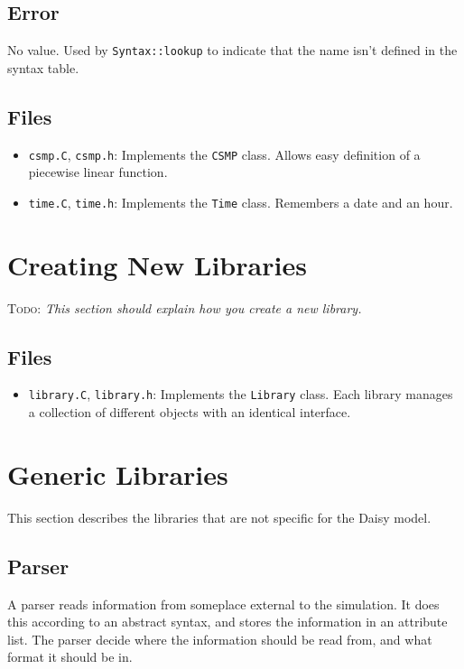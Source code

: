 \documentclass{article}
\newcommand{\code}[1]{\texttt{#1}}
\newcommand{\file}[1]{\texttt{#1}}
\newcommand{\todo}[1]{\textsc{Todo}: \textit{#1}}
\begin{document}
\subsection{Error}

No value.  Used by \code{Syntax::lookup} to indicate that the name
isn't defined in the syntax table.

\subsection{Files}

\begin{itemize}
\item \file{csmp.C}, \file{csmp.h}: Implements the \code{CSMP} class.
  Allows easy definition of a piecewise linear function.
\item \file{time.C}, \file{time.h}: Implements the \code{Time} class.
  Remembers a date and an hour.
\end{itemize}

\section{Creating New Libraries}
\label{new-libraries}

\todo{This section should explain how you create a new library.}

\subsection{Files}

\begin{itemize}
\item \file{library.C}, \file{library.h}: Implements the
  \code{Library} class.  Each library manages a collection of
  different objects with an identical interface.
\end{itemize}

\section{Generic Libraries}

This section describes the libraries that are not specific for the
Daisy model.

\subsection{Parser}

A parser reads information from someplace external to the simulation.
It does this according to an abstract syntax, and stores the
information in an attribute list.  The parser decide where the
information should be read from, and what format it should be in.
\end{document}
